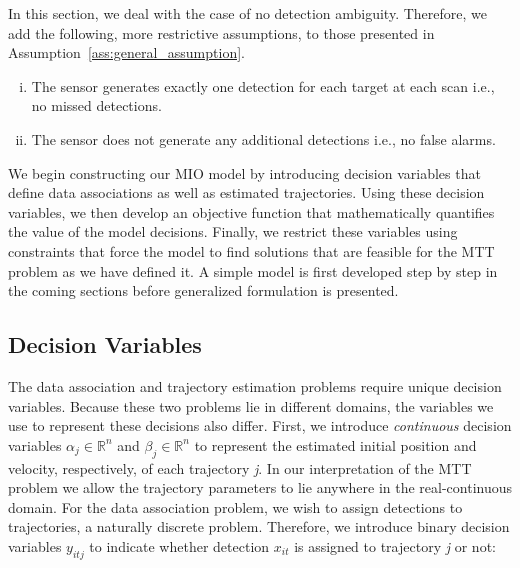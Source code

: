In this section, we deal with the case of no detection ambiguity. Therefore, we add the following, more restrictive assumptions, to those presented in Assumption~\ref{ass:general_assumption}.

\begin{assumption}\label{ass:basic_assumptions}
\leavevmode
\begin{enumerate}[(i)]
\item The sensor generates exactly one detection for each target
 at each scan i.e., no missed detections.
\item The sensor does not generate any additional detections
i.e., no false alarms.
\end{enumerate}
\end{assumption}


We begin constructing our MIO model by introducing decision variables that define data associations as well as estimated trajectories. Using these decision variables, we then develop an objective function that  mathematically quantifies the value of the model decisions. Finally, we restrict these variables using constraints that force the model to find solutions that are feasible for the MTT problem as we have defined it. A simple model is first developed step by step in the coming sections before generalized formulation is presented. 

\subsection{Decision Variables}
The data association and trajectory estimation problems require unique decision variables. Because these two problems lie in different domains, the variables we use to represent these decisions also differ. First, we introduce \textit{continuous} decision variables $\alpha_{j} \in \mathbb{R}^n$ and $\beta_{j} \in \mathbb{R}^n$ to represent the estimated initial position and velocity, respectively, of each trajectory \textit{j}. In our interpretation of the MTT problem we allow the trajectory parameters to lie anywhere in the real-continuous domain. For the data association problem, we wish to assign detections to trajectories, a naturally discrete problem. Therefore, we introduce binary decision variables $y_{itj}$ to indicate whether detection $x_{it}$ is assigned to trajectory \textit{j} or not:

